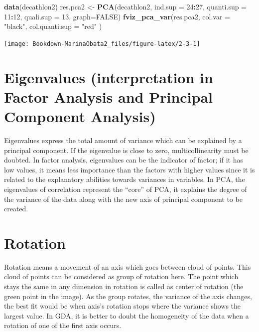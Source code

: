 \documentclass[]{book}
\newenvironment{Shaded}{\begin{snugshade}}{\end{snugshade}}
\newcommand{\DataTypeTok}[1]{\textcolor[rgb]{0.13,0.29,0.53}{#1}}
\newcommand{\DecValTok}[1]{\textcolor[rgb]{0.00,0.00,0.81}{#1}}
\newcommand{\KeywordTok}[1]{\textcolor[rgb]{0.13,0.29,0.53}{\textbf{#1}}}
\newcommand{\NormalTok}[1]{#1}
\newcommand{\OperatorTok}[1]{\textcolor[rgb]{0.81,0.36,0.00}{\textbf{#1}}}
\newcommand{\OtherTok}[1]{\textcolor[rgb]{0.56,0.35,0.01}{#1}}
\newcommand{\StringTok}[1]{\textcolor[rgb]{0.31,0.60,0.02}{#1}}
\begin{document}
\begin{Shaded}
\begin{Highlighting}[]
\KeywordTok{data}\NormalTok{(decathlon2)}
\NormalTok{res.pca2 <-}\StringTok{ }\KeywordTok{PCA}\NormalTok{(decathlon2, }\DataTypeTok{ind.sup =} \DecValTok{24}\OperatorTok{:}\DecValTok{27}\NormalTok{, }
               \DataTypeTok{quanti.sup =} \DecValTok{11}\OperatorTok{:}\DecValTok{12}\NormalTok{, }\DataTypeTok{quali.sup =} \DecValTok{13}\NormalTok{, }\DataTypeTok{graph=}\OtherTok{FALSE}\NormalTok{)}
\KeywordTok{fviz_pca_var}\NormalTok{(res.pca2,}
             \DataTypeTok{col.var =} \StringTok{"black"}\NormalTok{,     }
             \DataTypeTok{col.quanti.sup =} \StringTok{"red"} 
\NormalTok{             )}
\end{Highlighting}
\end{Shaded}

\texttt{[image: Bookdown-MarinaObata2\_files/figure-latex/2-3-1]}

\hypertarget{eigenvalues-interpretation-in-factor-analysis-and-principal-component-analysis}{%
\section{Eigenvalues (interpretation in Factor Analysis and Principal Component Analysis)}\label{eigenvalues-interpretation-in-factor-analysis-and-principal-component-analysis}}

Eigenvalues express the total amount of variance which can be explained by a principal component. If the eigenvalue is close to zero, multicollinearity must be doubted. In factor analysis, eigenvalues can be the indicator of factor; if it has low values, it means less importance than the factors with higher values since it is related to the explanatory abilities towards variances in variables.
In PCA, the eigenvalues of correlation represent the ``core'' of PCA, it explains the degree of the variance of the data along with the new axis of principal component to be created.

\hypertarget{rotation}{%
\section{Rotation}\label{rotation}}

Rotation means a movement of an axis which goes between cloud of points. This cloud of points can be considered as group of rotation here. The point which stays the same in any dimension in rotation is called as center of rotation (the green point in the image). As the group rotates, the variance of the axis changes, the best fit would be when axis's rotation stops where the variance shows the largest value. In GDA, it is better to doubt the homogeneity of the data when a rotation of one of the first axis occurs.
\end{document}

